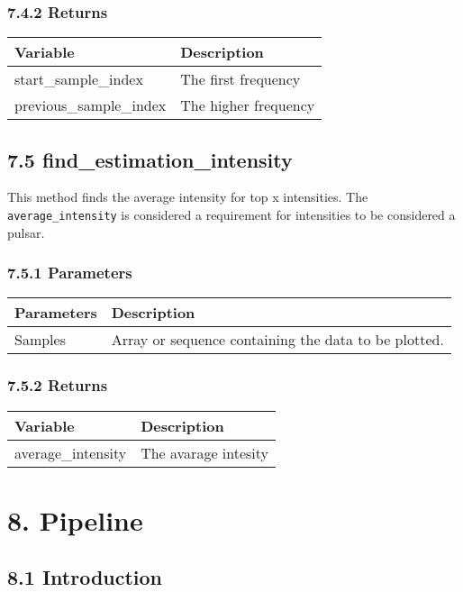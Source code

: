 \documentclass[]{article}
\begin{document}
\subsubsection{7.4.2 Returns}\label{returns-3}

\begin{longtable}[]{@{}ll@{}}
\toprule
Variable & Description\tabularnewline
\midrule
\endhead
start\_sample\_index & The first frequency\tabularnewline
previous\_sample\_index & The higher frequency\tabularnewline
\bottomrule
\end{longtable}

\subsection{7.5
find\_estimation\_intensity}\label{find_estimation_intensity}

This method finds the average intensity for top x intensities. The
\texttt{average\_intensity} is considered a requirement for intensities
to be considered a pulsar.

\subsubsection{7.5.1 Parameters}\label{parameters-6}

\begin{longtable}[]{@{}ll@{}}
\toprule
Parameters & Description\tabularnewline
\midrule
\endhead
Samples & Array or sequence containing the data to be
plotted.\tabularnewline
\bottomrule
\end{longtable}

\subsubsection{7.5.2 Returns}\label{returns-4}

\begin{longtable}[]{@{}ll@{}}
\toprule
Variable & Description\tabularnewline
\midrule
\endhead
average\_intensity & The avarage intesity\tabularnewline
\bottomrule
\end{longtable}

\section{8. Pipeline}\label{pipeline}

\subsection{8.1 Introduction}\label{introduction-1}
\end{document}
